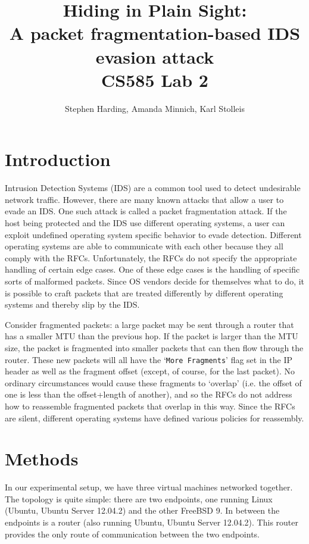 \documentclass[]{article}
\begin{document}
\title{Hiding in Plain Sight: \\ 
\Large A packet fragmentation-based IDS evasion attack \\
\large CS585 Lab 2}
\author{Stephen Harding, Amanda Minnich, Karl Stolleis}

\maketitle
\newpage
\section{Introduction}

Intrusion Detection Systems (IDS) are a common tool used to detect undesirable network traffic. However, there are many known attacks that allow a user to evade an IDS. One such attack is called a packet fragmentation attack. If the host being protected and the IDS use different operating systems, a user can exploit undefined operating system specific behavior to evade detection. Different operating systems are able to communicate with each other because they all comply with the RFCs. Unfortunately, the RFCs do not specify the appropriate handling of certain edge cases. One of these edge cases is the handling of specific sorts of malformed packets. Since OS vendors decide for themselves what to do, it is possible to craft packets that are treated differently by different operating systems and thereby slip by the IDS.

Consider fragmented packets: a large packet may be sent through a router that has a smaller MTU than the previous hop. If the packet is larger than the MTU size, the packet is fragmented into smaller packets that can then flow through the router. These new packets will all have the `\texttt{More Fragments}' flag set in the IP header as well as the fragment offset (except, of course, for the last packet). No ordinary circumstances would cause these fragments to `overlap' (i.e. the offset of one is less than the offset+length of another), and so the RFCs do not address how to reassemble fragmented packets that overlap in this way. Since the RFCs are silent, different operating systems have defined various policies for reassembly.

\section{Methods}

In our experimental setup, we have three virtual machines networked together. The topology is quite simple: there are two endpoints, one running Linux (Ubuntu, Ubuntu Server 12.04.2) and the other FreeBSD 9. In between the endpoints is a router (also running Ubuntu, Ubuntu Server 12.04.2). This router provides the only route of communication between the two endpoints.
\end{document}
